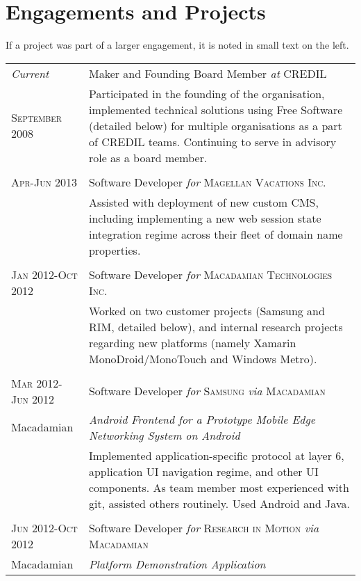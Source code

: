\documentclass[letterpaper,10pt]{article}
\begin{document}
\section{Engagements and Projects}
\footnotesize{If a project was part of a larger engagement, it is noted in small text on the left.}
\begin{longtable}{p{3cm}|p{12cm}}
  \emph{Current} & Maker and Founding Board Member \emph{at} \textsc{CREDIL} \\
  \textsc{September 2008} & \footnotesize{Participated in the founding of the organisation, implemented technical solutions using Free Software (detailed below) for multiple organisations as a part of CREDIL teams.  Continuing to serve in advisory role as a board member.} \\
\multicolumn{2}{c}{} \\
  \textsc{Apr-Jun 2013} & Software Developer \emph{for} \textsc{Magellan Vacations Inc.} \\
   & \footnotesize{Assisted with deployment of new custom CMS, including implementing a new web session state integration regime across their fleet of domain name properties.} \\
\multicolumn{2}{c}{} \\
  \textsc{Jan 2012-Oct 2012} & Software Developer \emph{for} \textsc{Macadamian Technologies Inc.} \\
   & \footnotesize{Worked on two customer projects (Samsung and RIM, detailed below), and internal research projects regarding new platforms (namely Xamarin MonoDroid/MonoTouch and Windows Metro).} \\
\multicolumn{2}{c}{} \\
  \textsc{Mar 2012-Jun 2012} & Software Developer \emph{for} \textsc{Samsung} \emph{via} \textsc{Macadamian} \\
  \tiny{Macadamian} & \emph{Android Frontend for a Prototype Mobile Edge Networking System on Android} \\
   & \footnotesize{Implemented application-specific protocol at layer 6, application UI navigation regime, and other UI components.  As team member most experienced with git, assisted others routinely.  Used Android and Java.} \\
\pagebreak
\multicolumn{2}{c}{} \\
  \textsc{Jun 2012-Oct 2012} & Software Developer \emph{for} \textsc{Research in Motion} \emph{via} \textsc{Macadamian} \\
  \tiny{Macadamian} & \emph{Platform Demonstration Application} \\

\end{longtable}
\end{document}
